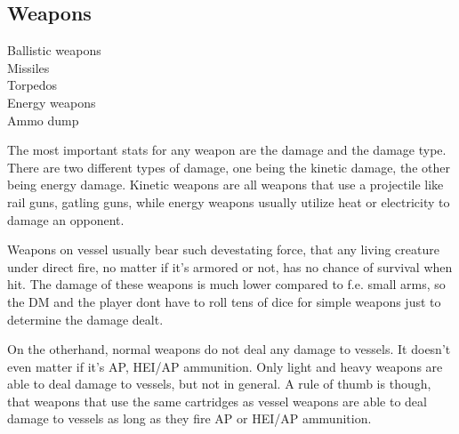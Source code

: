 \subsection{Weapons}
\label{sub:Vessel-Weapons}

\begin{description}
  \item[Ballistic weapons]
  \item[Missiles]
  \item[Torpedos]
  \item[Energy weapons]
  \item[Ammo dump]
\end{description}

The most important stats for any weapon are the damage and the damage type. There are two different types of damage, one being the kinetic damage, the other being energy damage. Kinetic weapons are all weapons that use a projectile like rail guns, gatling guns, while energy weapons usually utilize heat or electricity to damage an opponent.

Weapons on vessel usually bear such devestating force, that any living creature under direct fire, no matter if it's armored or not, has no chance of survival when hit. The damage of these weapons is much lower compared to f.e. small arms, so the DM and the player dont have to roll tens of dice for simple weapons just to determine the damage dealt.

On the otherhand, normal weapons do not deal any damage to vessels. It doesn't even matter if it's AP, HEI/AP ammunition. Only light and heavy weapons are able to deal damage to vessels, but not in general. A rule of thumb is though, that weapons that use the same cartridges as vessel weapons are able to deal damage to vessels as long as they fire AP or HEI/AP ammunition.

